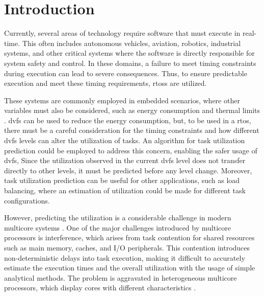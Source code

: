\chapter{Introduction}

Currently, several areas of technology require software that must execute in real-time. This often includes autonomous vehicles, aviation, robotics, industrial systems, and other critical systems where the software is directly responsible for system safety and control. In these domains, a failure to meet timing constraints during execution can lead to severe consequences. Thus, to ensure predictable execution and meet these timing requirements, \glspl{rtos} are utilized.

These systems are commonly employed in embedded scenarios, where other variables must also be considered, such as energy consumption and thermal limits \cite{rahim2025survey}. \gls{dvfs} can be used to reduce the energy consumption, but, to be used in a \gls{rtos}, there must be a careful consideration for the timing constraints and how different \gls{dvfs} levels can alter the utilization of tasks. An algorithm for task utilization prediction could be employed to address this concern, enabling the safer usage of \gls{dvfs}, Since the utilization observed in the current \gls{dvfs} level does not transfer directly to other levels, it must be predicted before any level change. Moreover, task utilization prediction can be useful for other applications, such as load balancing, where an estimation of utilization could be made for different task configurations.

However, predicting the utilization is a considerable challenge in modern multicore systems \cite{ul2018task, hoffmann2021online}. One of the major challenges introduced by multicore processors is interference, which arises from task contention for shared resources such as main memory, caches, and I/O peripherals. This contention introduces non-deterministic delays into task execution, making it difficult to accurately estimate the execution times and the overall utilization \cite{gracioli2019designing, horstmann2019framework, aceituno2023optimized, lugo2022survey} with the usage of simple analytical methods. The problem is aggravated in heterogeneous multicore processors, which display cores with different characteristics \cite{mrabet2024scheduling, jadon2024comprehensive}.

